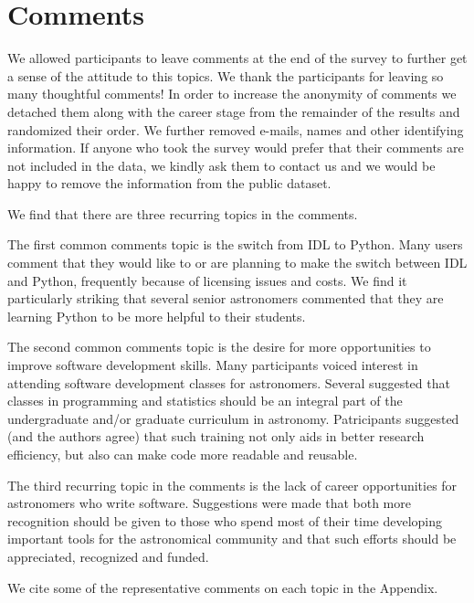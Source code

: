 \section{Comments}
\label{sec:comments}

We allowed participants to leave comments at the end of the survey to further get a sense of the attitude to this topics. We thank the participants for leaving so many thoughtful comments! In order to increase the anonymity of comments we detached them along with the career stage from the remainder of the results and randomized their order. We further removed e-mails, names and other identifying information. If anyone who took the survey would prefer that their comments are not included in the data, we kindly ask them to contact us and we would be happy to remove the information from the public dataset. 

We find that there are three recurring topics in the comments. 

The first common comments topic is the switch from IDL to Python. Many users comment that they would like to or are planning to make the switch between IDL and Python, frequently because of licensing issues and costs. We find it particularly striking that several senior astronomers commented that they are learning Python to be more helpful to their students.

The second common comments topic is the desire for more opportunities to improve software development skills. Many participants voiced interest in attending software development classes for astronomers. Several suggested that classes in programming and statistics should be an integral part of the undergraduate and/or graduate curriculum in astronomy. Patricipants suggested (and the authors agree) that such training not only aids in better research efficiency, but also can make code more readable and reusable. 

The third recurring topic in the comments is the lack of career opportunities for astronomers who write software. Suggestions were made that both more recognition should be given to those who spend most of their time developing important tools for the astronomical community and that such efforts should be appreciated, recognized and funded. 

We cite some of the representative comments on each topic in the Appendix.

